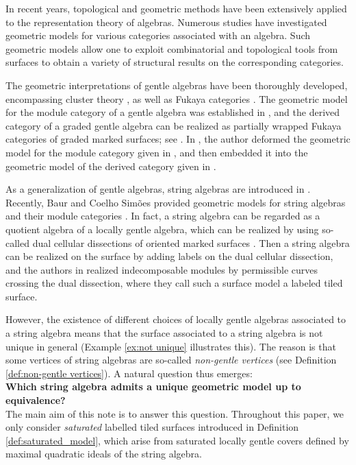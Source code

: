\documentclass[11pt]{amsart}
\numberwithin{equation}{section}
\theoremstyle{definition}
\begin{document}
In recent years, topological and geometric methods have been extensively applied to the representation theory of algebras.
Numerous studies have investigated geometric models for various categories associated with an algebra. Such geometric models allow one to exploit combinatorial and topological tools from surfaces to obtain a variety of structural results on the corresponding categories.

The geometric interpretations of gentle algebras have been thoroughly developed, encompassing cluster theory \cite{ABCJP12,BZ11,CCS06,CS17,L09}, as well as Fukaya categories \cite{HKK17,LP20}. 
The geometric model for the module category of a gentle algebra was established in \cite{BC21}, and the derived category of a graded gentle algebra can be realized as partially wrapped Fukaya categories of graded marked surfaces; see \cite{HKK17,LP20,OPS18}.
In \cite{C26}, the author deformed the geometric model for the module category given in \cite{BC21}, and then embedded it into the geometric model of the derived category given in \cite{OPS18}.

As a generalization of gentle algebras, string algebras are introduced in \cite{BR87}.
Recently, Baur and Coelho Simões provided geometric models for string algebras and their module categories \cite{BC24}. In fact, a string algebra can be regarded as a quotient algebra of a locally gentle algebra, which can be realized by using so-called dual cellular dissections of oriented marked surfaces \cite {PPP19}. 
Then a string algebra can be realized on the surface by adding labels on the dual cellular dissection, and the authors in \cite{BC24} realized indecomposable modules by permissible curves crossing the dual dissection, where they call such a surface model a labeled tiled surface. 

However, the existence of different choices of locally gentle algebras associated to a string algebra means that the surface associated to a string algebra is not unique in
general (Example \ref{ex:not unique} illustrates this). The reason is that some vertices of string algebras are so-called \emph{non-gentle vertices}  (see Definition \ref{def:non-gentle vertices}). A natural question thus emerges: \\

{\bf Which string algebra admits a unique geometric model up to equivalence?}\\

The main aim of this note is to answer this question. Throughout this paper, we only consider \emph{saturated} labelled tiled surfaces introduced in Definition \ref{def:saturated_model}, which arise from saturated locally gentle covers defined by maximal quadratic ideals of the string algebra.
\end{document}
